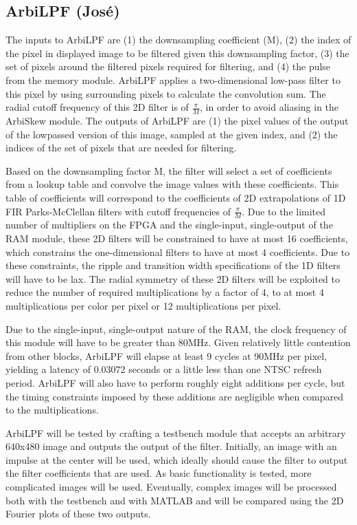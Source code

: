 \documentclass[10pt]{article}
\begin{document}
\subsection{ArbiLPF (Jos\'{e})}
The inputs to ArbiLPF are (1) the downsampling coefficient (M), (2) the index of the pixel in displayed image to be filtered given this downsampling factor, (3) the set of pixels around the filtered pixels required for filtering, and (4) the pulse from the memory module. ArbiLPF applies a two-dimensional low-pass filter to this pixel by using surrounding pixels to calculate the convolution sum. The radial cutoff frequency of this 2D filter is of \( \frac{\pi}{M} \), in order to avoid aliasing in the ArbiSkew module. The outputs of ArbiLPF are (1) the pixel values of the output of the lowpassed version of this image, sampled at the given index, and (2) the indices of the set of pixels that are needed for filtering.

Based on the downsampling factor M, the filter will select a set of coefficients from a lookup table and convolve the image values with these coefficients. This table of coefficients will correspond to the coefficients of 2D extrapolations of 1D FIR Parks-McClellan filters with cutoff frequencies of \( \frac{\pi}{M} \). Due to the limited number of multipliers on the FPGA and the single-input, single-output of the RAM module, these 2D filters will be constrained to have at most 16 coefficients, which constrains the one-dimensional filters to have at most 4 coefficients. Due to these constraints, the ripple and transition width specifications of the 1D filters will have to be lax. The radial symmetry of these 2D filters will be exploited to reduce the number of required multiplications by a factor of 4, to at most 4 multiplications per color per pixel or 12 multiplications per pixel.

Due to the single-input, single-output nature of the RAM, the clock frequency of this module will have to be greater than 80MHz. Given relatively little contention from other blocks, ArbiLPF will elapse at least 9 cycles at 90MHz per pixel, yielding a latency of 0.03072 seconds or a little less than one NTSC refresh period. ArbiLPF will also have to perform roughly eight additions per cycle, but the timing constraints imposed by these additions are negligible when compared to the multiplications.

ArbiLPF will be tested by crafting a testbench module that accepts an arbitrary 640x480 image and outputs the output of the filter. Initially, an image with an impulse at the center will be used, which ideally should cause the filter to output the filter coefficients that are used. As basic functionality is tested, more complicated images will be used. Eventually, complex images will be processed both with the testbench and with MATLAB and will be compared using the 2D Fourier plots of these two outputs.
\end{document}
